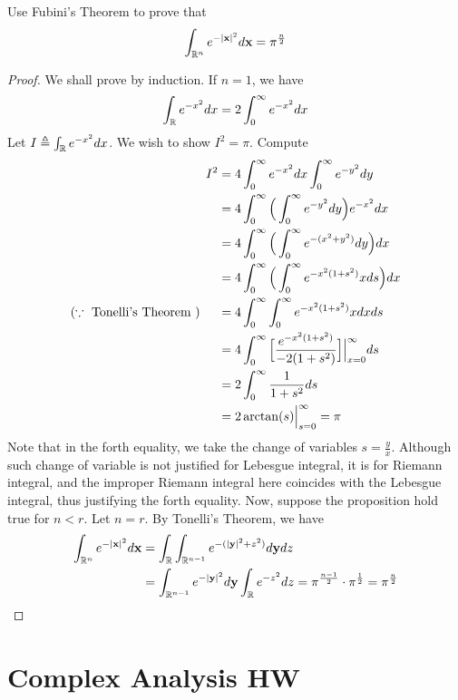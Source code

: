 \documentclass{report}
\begin{document}
\begin{question}{}{}
Use Fubini's Theorem to prove that 
\begin{align*}
\int_{\mathbb{R}^n} e^{-\left|\textbf{x}\right|^2}d \textbf{x}= \pi  ^{\frac{n}{2}}
\end{align*}
\end{question}
\begin{proof}
We shall prove by induction. If $n=1$, we have
 \begin{align*}
\int_{\mathbb{R}}e^{-x^2}dx= 2\int_{0}^{\infty} e^{-x^2}dx 
\end{align*}
Let $I\triangleq \int_{\mathbb{R}}e^{-x^2}dx$. We wish to show $I^2= \pi $. Compute 
\begin{align*}
I^2&=4\int_0^{\infty} e^{-x^2}dx \int_0^{\infty}e^{-y^2}dy \\
&=4\int_0^{\infty} \Big(\int_0^{\infty}e^{-y^2}dy \Big) e^{-x^2}dx \\
&=4\int_0^{\infty} \Big( \int_0^{\infty} e^{-(x^2+y^2)} dy \Big)dx \\
&=4 \int_0^{\infty}\Big( \int_0^{\infty}e^{-x^2(1+s^2)} xds \Big) dx \\
(\because \text{ Tonelli's Theorem })\hspace{0.5cm}&= 4\int_0^{\infty} \int_0^{\infty} e^{-x^2(1+s^2)}xdxds \\
&=4\int_0^{\infty} \Big[ \frac{e^{-x^2(1+s^2)}}{-2 (1+s^2)} \Big] \Big|_{x=0}^{\infty} ds \\
&=2\int_0^{\infty} \frac{1}{1+s^2}ds \\
&=2 \arctan (s)\Big|_{s=0}^{\infty} = \pi 
\end{align*}
Note that in the forth equality, we take the change of variables $s= \frac{y}{x}$. Although such change of variable is not justified for Lebesgue integral, it is for Riemann integral, and the improper Riemann integral here coincides with the Lebesgue integral, thus justifying the forth equality. Now, suppose the proposition hold true for $n<r$. Let $n=r$. By Tonelli's Theorem, we have 
\begin{align*}
  \int_{\mathbb{R}^n}e^{- \left|\textbf{x}\right|^2}d\textbf{x} &=\int_{\mathbb{R}} \int_{\mathbb{R}^{n-1}} e^{-(\left|\textbf{y}\right|^2+z^2)} d \textbf{y}dz \\
  &= \int_{\mathbb{R}^{n-1}}e ^{- \left|\textbf{y}\right|^2} d \textbf{y} \int_{\mathbb{R}}e ^{-z^2}dz = \pi  ^{\frac{n-1}{2}}\cdot \pi  ^{\frac{1}{2}}= \pi  ^{\frac{n}{2}}
\end{align*}

\end{proof}
\chapter{Complex Analysis HW}
\end{document}
